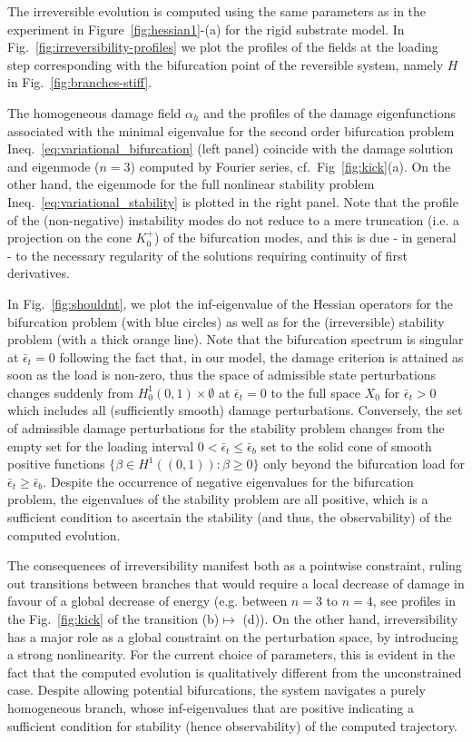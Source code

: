 \documentclass[10pt]{article}
\begin{document}
The irreversible evolution is computed using the same parameters as in the experiment in Figure~\ref{fig:hessian1}-(a) for the rigid substrate model. In Fig.~\ref{fig:irreversibility-profiles} we plot the profiles of the fields at the loading step corresponding with the bifurcation point of the reversible system, namely $H$ in Fig.~\ref{fig:branches-stiff}.


The homogeneous damage field $\alpha_h$ and the profiles of the damage eigenfunctions associated with  the minimal eigenvalue for the second order bifurcation problem Ineq.~\eqref{eq:variational_bifurcation} (left panel) coincide with the damage solution and eigenmode ($n=3$) computed by Fourier series, {cf.~Fig~\ref{fig:kick}(a).}
On the other hand, the eigenmode for the full nonlinear stability problem Ineq.~\eqref{eq:variational_stability} is plotted in the right panel.
Note that the profile of the (non-negative) instability modes do not reduce to a mere truncation (i.e. a projection on the cone $K^+_0$) of the bifurcation modes, and this is due - in general - to the necessary regularity of the solutions requiring continuity of first derivatives. 

%

In Fig.~\ref{fig:shouldnt}, we plot the inf-eigenvalue of the Hessian operators for the bifurcation problem (with blue circles) as well as for the (irreversible) stability problem (with a thick orange line). 
Note that the bifurcation spectrum is singular at $\bar \epsilon_t=0$ following the fact that, in our model, the damage criterion is attained as soon as the load is non-zero, thus the space of admissible state perturbations changes suddenly from $H^1_0(0,1) \times \emptyset$ at $\bar \epsilon_t=0$ to the full space $X_0$ for $\bar \epsilon_t>0$ which includes all (sufficiently smooth) damage perturbations. 
Conversely, the set of admissible damage perturbations for the stability problem changes from the empty set for the loading interval $0 < \bar\epsilon_t\leq \bar\epsilon_b$ set to the solid cone of smooth positive functions $\{\beta\in H^1((0,1)):\beta \geq 0\}$ only beyond the bifurcation load for $\bar\epsilon_t \geq \bar\epsilon_b$.
Despite the occurrence of negative eigenvalues for the bifurcation problem, the eigenvalues of the stability problem are all positive, which is a sufficient condition to ascertain the stability (and thus, the observability) of the computed evolution.

The consequences of irreversibility manifest both as a pointwise constraint, ruling out transitions between branches that would require a local decrease of damage in favour of a global decrease of energy (e.g. between $n=3$ to $n=4$, see profiles in the Fig.~\ref{fig:kick} of the transition (b)$\mapsto$ (d)). 
On the other hand, irreversibility has a major role  as a global constraint on the perturbation space, by introducing a strong nonlinearity. For the current choice of parameters, this is evident in the fact that the computed evolution is qualitatively different from the unconstrained case. Despite allowing potential bifurcations, the system navigates a purely homogeneous branch, whose inf-eigenvalues that are positive indicating a sufficient condition for stability (hence observability) of the computed trajectory.
\end{document}
